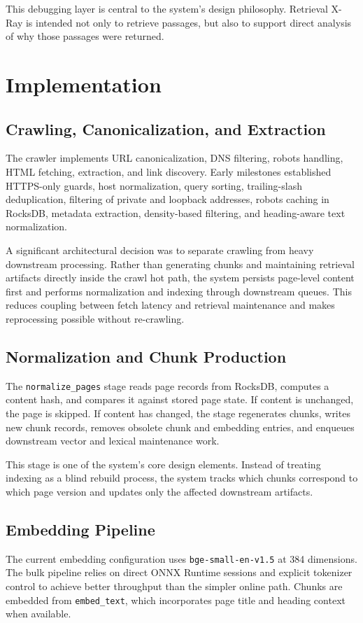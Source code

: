 \documentclass[conference]{IEEEtran}
\newcommand{\system}{Retrieval X-Ray\xspace}
\begin{document}
This debugging layer is central to the system's design philosophy. \system is intended not only to retrieve passages, but also to support direct analysis of why those passages were returned.

\section{Implementation}
\subsection{Crawling, Canonicalization, and Extraction}
The crawler implements URL canonicalization, DNS filtering, robots handling, HTML fetching, extraction, and link discovery. Early milestones established HTTPS-only guards, host normalization, query sorting, trailing-slash deduplication, filtering of private and loopback addresses, robots caching in RocksDB, metadata extraction, density-based filtering, and heading-aware text normalization.

A significant architectural decision was to separate crawling from heavy downstream processing. Rather than generating chunks and maintaining retrieval artifacts directly inside the crawl hot path, the system persists page-level content first and performs normalization and indexing through downstream queues. This reduces coupling between fetch latency and retrieval maintenance and makes reprocessing possible without re-crawling.

\subsection{Normalization and Chunk Production}
The \texttt{normalize\_pages} stage reads page records from RocksDB, computes a content hash, and compares it against stored page state. If content is unchanged, the page is skipped. If content has changed, the stage regenerates chunks, writes new chunk records, removes obsolete chunk and embedding entries, and enqueues downstream vector and lexical maintenance work.

This stage is one of the system's core design elements. Instead of treating indexing as a blind rebuild process, the system tracks which chunks correspond to which page version and updates only the affected downstream artifacts.

\subsection{Embedding Pipeline}
The current embedding configuration uses \texttt{bge-small-en-v1.5} at 384 dimensions. The bulk pipeline relies on direct ONNX Runtime sessions and explicit tokenizer control to achieve better throughput than the simpler online path. Chunks are embedded from \texttt{embed\_text}, which incorporates page title and heading context when available.
\end{document}
